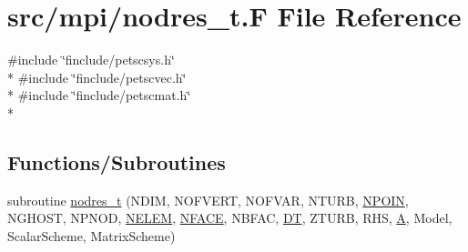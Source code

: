 \hypertarget{mpi_2nodres__t_8_f}{\section{src/mpi/nodres\-\_\-t.F File Reference}
\label{mpi_2nodres__t_8_f}
}
{\ttfamily \#include \char`\"{}finclude/petscsys.\-h\char`\"{}}\\*
{\ttfamily \#include \char`\"{}finclude/petscvec.\-h\char`\"{}}\\*
{\ttfamily \#include \char`\"{}finclude/petscmat.\-h\char`\"{}}\\*
\subsection*{Functions/\-Subroutines}
\begin{DoxyCompactItemize}
\item 
subroutine \hyperlink{mpi_2nodres__t_8_f_a44983e2bd13c55243a30a2d9eacd661d}{nodres\-\_\-t} (N\-D\-I\-M, N\-O\-F\-V\-E\-R\-T, N\-O\-F\-V\-A\-R, N\-T\-U\-R\-B, \hyperlink{mesh_8com_ae28c1572321efcd8715b974d87d20c58}{N\-P\-O\-I\-N}, N\-G\-H\-O\-S\-T, N\-P\-N\-O\-D, \hyperlink{mesh_8com_aee5e75b79d0e815c0603cfbccc618957}{N\-E\-L\-E\-M}, \hyperlink{mesh_8com_a78142d59d4cbb9fedbede16187658dd3}{N\-F\-A\-C\-E}, N\-B\-F\-A\-C, \hyperlink{myts_8com_a41549d5ede5e2b840495daf35608da41}{D\-T}, Z\-T\-U\-R\-B, R\-H\-S, \hyperlink{ibc2_8com_ad2108d58343608772fff791c23da58f5}{A}, Model, Scalar\-Scheme, Matrix\-Scheme)
\end{DoxyCompactItemize}


